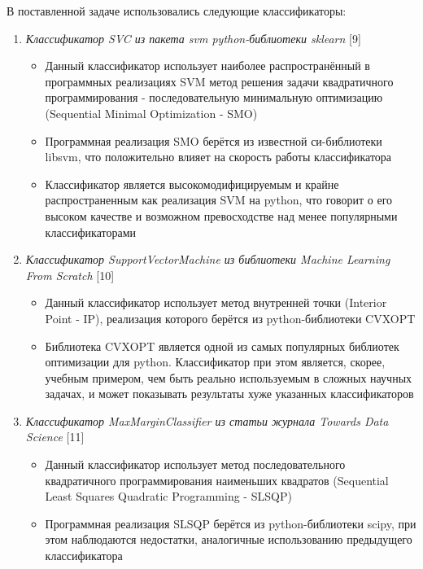 В поставленной задаче использовались следующие классификаторы:
\begin{enumerate}
    \item \textit{Классификатор SVC из пакета svm python-библиотеки sklearn} [9]
        \begin{itemize}
            \item Данный классификатор использует наиболее распространённый в программных реализациях SVM метод решения задачи квадратичного программирования - последовательную минимальную оптимизацию (Sequential Minimal Optimization - SMO)
            \item Программная реализация SMO берётся из известной си-библиотеки libsvm, что положительно влияет на скорость работы классификатора
            \item Классификатор является высокомодифицируемым и крайне распространенным как реализация SVM на python, что говорит о его высоком качестве и возможном превосходстве над менее популярными классификаторами
        \end{itemize}
    \item \textit{Классификатор SupportVectorMachine из библиотеки Machine Learning From Scratch} [10]
        \begin{itemize}
            \item Данный классификатор использует метод внутренней точки (Interior Point - IP), реализация которого берётся из python-библиотеки CVXOPT
            \item Библиотека CVXOPT является одной из самых популярных библиотек оптимизации для python. Классификатор при этом является, скорее, учебным примером, чем быть реально используемым в сложных научных задачах, и может показывать результаты хуже указанных классификаторов
        \end{itemize}
    \item \textit{Классификатор MaxMarginClassifier из статьи журнала Towards Data Science} [11]
        \begin{itemize}
            \item Данный классификатор использует метод последовательного квадратичного программирования наименьших квадратов (Sequential Least Squares Quadratic Programming - SLSQP)
            \item Программная реализация SLSQP берётся из python-библиотеки scipy, при этом наблюдаются недостатки, аналогичные использованию предыдущего классификатора
        \end{itemize}
\end{enumerate}

